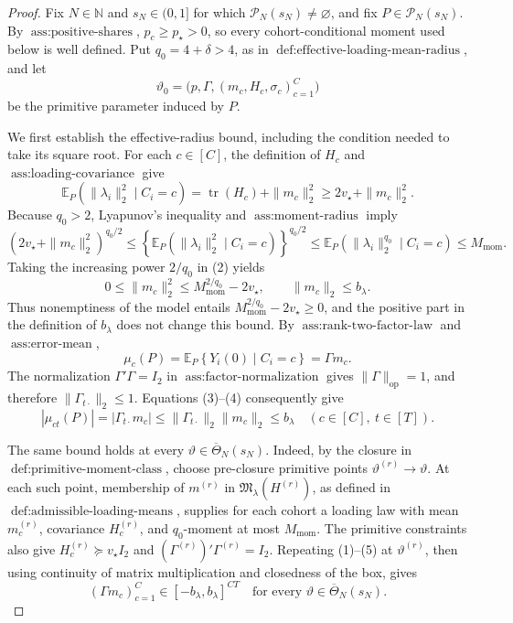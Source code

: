 \documentclass{article}
\begin{document}
\begin{proof}
Fix \(N\in\mathbb N\) and \(s_N\in(0,1]\) for which \(\mathcal P_N(s_N)\neq\varnothing\), and fix \(P\in\mathcal P_N(s_N)\).  By \(\operatorname{ass:positive\text{-}shares}\), \(p_c\geq p_\star>0\), so every cohort-conditional moment used below is well defined.  Put \(q_0=4+\delta>4\), as in \(\operatorname{def:effective\text{-}loading\text{-}mean\text{-}radius}\), and let
\[
 \vartheta_0=\bigl(p,\Gamma,(m_c,H_c,\sigma_c)_{c=1}^C\bigr)
\]
be the primitive parameter induced by \(P\).

We first establish the effective-radius bound, including the condition needed to take its square root.  For each \(c\in[C]\), the definition of \(H_c\) and \(\operatorname{ass:loading\text{-}covariance}\) give
\[
 \mathbb E_P\!\left(\|\lambda_i\|_2^2\mid C_i=c\right)
 =\operatorname{tr}(H_c)+\|m_c\|_2^2
 \geq 2v_\star+\|m_c\|_2^2.
 \tag{1}
\]
Because \(q_0>2\), Lyapunov's inequality and \(\operatorname{ass:moment\text{-}radius}\) imply
\[
 \left(2v_\star+\|m_c\|_2^2\right)^{q_0/2}
 \leq
 \left\{\mathbb E_P\!\left(\|\lambda_i\|_2^2\mid C_i=c\right)\right\}^{q_0/2}
 \leq
 \mathbb E_P\!\left(\|\lambda_i\|_2^{q_0}\mid C_i=c\right)
 \leq M_{\mathrm{mom}}.
 \tag{2}
\]
Taking the increasing power \(2/q_0\) in (2) yields
\[
 0\leq\|m_c\|_2^2
 \leq M_{\mathrm{mom}}^{2/q_0}-2v_\star,
 \qquad
 \|m_c\|_2\leq b_\lambda.
 \tag{3}
\]
Thus nonemptiness of the model entails \(M_{\mathrm{mom}}^{2/q_0}-2v_\star\geq0\), and the positive part in the definition of \(b_\lambda\) does not change this bound.  By \(\operatorname{ass:rank\text{-}two\text{-}factor\text{-}law}\) and \(\operatorname{ass:error\text{-}mean}\),
\[
 \mu_c(P)=\mathbb E_P\!\left\{Y_i(0)\mid C_i=c\right\}=\Gamma m_c.
 \tag{4}
\]
The normalization \(\Gamma'\Gamma=I_2\) in \(\operatorname{ass:factor\text{-}normalization}\) gives \(\|\Gamma\|_{\mathrm{op}}=1\), and therefore \(\|\Gamma_{t\cdot}\|_2\leq1\).  Equations (3)--(4) consequently give
\[
 |\mu_{ct}(P)|=|\Gamma_{t\cdot}m_c|
 \leq\|\Gamma_{t\cdot}\|_2\|m_c\|_2
 \leq b_\lambda
 \quad(c\in[C],\ t\in[T]).
 \tag{5}
\]

The same bound holds at every \(\vartheta\in\overline\Theta_N(s_N)\).  Indeed, by the closure in \(\operatorname{def:primitive\text{-}moment\text{-}class}\), choose pre-closure primitive points \(\vartheta^{(r)}\to\vartheta\).  At each such point, membership of \(m^{(r)}\) in \(\mathfrak M_\lambda(H^{(r)})\), as defined in \(\operatorname{def:admissible\text{-}loading\text{-}means}\), supplies for each cohort a loading law with mean \(m_c^{(r)}\), covariance \(H_c^{(r)}\), and \(q_0\)-moment at most \(M_{\mathrm{mom}}\).  The primitive constraints also give \(H_c^{(r)}\succeq v_\star I_2\) and \((\Gamma^{(r)})'\Gamma^{(r)}=I_2\).  Repeating (1)--(5) at \(\vartheta^{(r)}\), then using continuity of matrix multiplication and closedness of the box, gives
\[
 (\Gamma m_c)_{c=1}^C\in[-b_\lambda,b_\lambda]^{CT}
 \quad\text{for every }\vartheta\in\overline\Theta_N(s_N).
 \tag{6}
\]


\end{proof}
\end{document}
